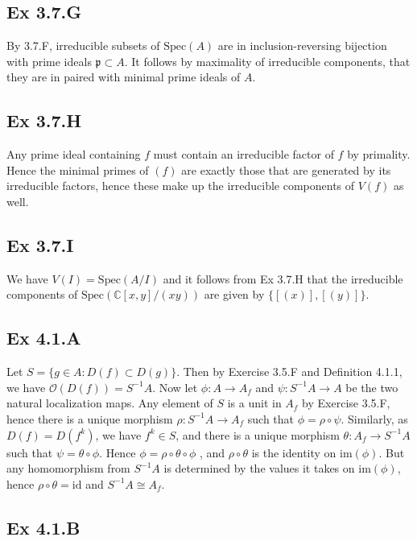 \documentclass{article}
\theoremstyle{definition}
\newcommand{\C}{\mathbb{C}}
\newcommand{\Spec}{\text{Spec}}
\newcommand{\im}{\text{im}}
\newcommand{\id}{\text{id}}
\begin{document}
\subsection*{Ex 3.7.G}

By 3.7.F, irreducible subsets of $\Spec(A)$ are in inclusion-reversing
bijection with prime ideals $\mathfrak{p} \subset A$. It follows by maximality
of irreducible components, that they are in paired with minimal prime ideals of
$A$.

\subsection*{Ex 3.7.H}

Any prime ideal containing $f$ must contain an irreducible factor of $f$ by
primality. Hence the minimal primes of $(f)$ are exactly those that are
generated by its irreducible factors, hence these make up the irreducible
components of $V(f)$ as well.

\subsection*{Ex 3.7.I}

We have $V(I) = \Spec(A/I)$ and it follows from Ex 3.7.H that the irreducible
components of $\Spec(\C[x, y]/(xy))$ are given by $\{[(x)], [(y)]\}$.

\subsection*{Ex 4.1.A}

Let $S = \{g \in A : D(f) \subset D(g) \}$. Then by Exercise 3.5.F and
Definition 4.1.1, we have $\mathcal{O}(D(f)) = S^{-1} A$. Now let $\phi : A \to
A_f$ and $\psi : S^{-1}A \to A$ be the two natural localization maps. Any
element of $S$ is a unit in $A_f$ by Exercise 3.5.F, hence there is a unique
morphism $\rho : S^{-1}A \to A_f$ such that $\phi = \rho \circ \psi$.
Similarly, as $D(f) = D(f^k)$, we have $f^k \in S$, and there is a unique
morphism $\theta : A_f \to S^{-1}A$ such that $\psi = \theta \circ \phi$. Hence
$\phi = \rho \circ \theta \circ \phi$ , and $\rho \circ \theta$ is the identity
on $\im(\phi)$. But any homomorphism from $S^{-1}A$ is determined by the values
it takes on $\im(\phi)$, hence $\rho \circ \theta = \id$ and $S^{-1}A \cong
A_f$.

\subsection*{Ex 4.1.B}
\end{document}
